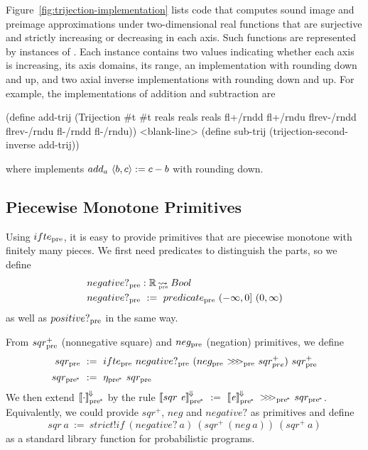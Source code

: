 Figure~\ref{fig:trijection-implementation} lists code that computes sound image and preimage approximations under two-dimensional real functions that are surjective and strictly increasing or decreasing in each axis.
Such functions are represented by instances of .
Each instance contains two  values indicating whether each axis is increasing, its axis domains, its range, an implementation with rounding down and up, and two axial inverse implementations with rounding down and up.
For example, the implementations of addition and subtraction are
\begin{center}\singlespacing
\begin{schemedisplay}
(define add-trij
  (Trijection #t #t reals reals reals
              fl+/rndd fl+/rndu
              flrev-/rndd flrev-/rndu
              fl-/rndd fl-/rndu))
<blank-line>
(define sub-trij
  (trijection-second-inverse add-trij))
\end{schemedisplay}
\end{center}
where  implements $add_a~\langle{b,c}\rangle := c - b$ with rounding down.

\subsection{Piecewise Monotone Primitives}
\label{sec:piecewise-monotone-primitives}

Using $ifte_\mathrm{pre}$, it is easy to provide primitives that are piecewise monotone with finitely many pieces.
We first need predicates to distinguish the parts, so we define
\begin{equation}
\begin{aligned}
	&negative?_\mathrm{pre} : \mathbb{R} \operatorname{\rightsquigarrow_{\mspace{-20mu}_\mathrm{pre}}} Bool \\
	&negative?_\mathrm{pre}\ :=\ predicate_\mathrm{pre}~(-\infty,0]~(0,\infty)
\end{aligned}
\label{eqn:negative-pre}
\end{equation}
as well as $positive?_\mathrm{pre}$ in the same way.

From $sqr^+_\mathrm{pre}$ (nonnegative square) and $neg_\mathrm{pre}$ (negation) primitives, we define
\begin{equation}
\begin{aligned}
	sqr\pre&\ :=\ \ifpre~negative?\pre~(neg\pre~\comppre~sqr^+_{pre})~sqr^+\pre
\\
	sqr\ppre&\ :=\ \eta\ppre~sqr\pre
\end{aligned}
\end{equation}
We then extend $\left\llbracket{\cdot}\right\rrbracket^{\mspace{-2mu}\Downarrow\mspace{-2mu}}_\mathrm{pre^{\mspace{-2mu}*}}$ by the rule $\meaningofconv{sqr~\mathit{e}}\ppre\ :=\ \meaningofconv{\mathit{e}}\ppre~\compppre~sqr\ppre$.
Equivalently, we could provide $sqr^+$, $neg$ and $negative?$ as primitives and define
\begin{equation}
	sqr~a\ :=\ strict!if~(negative?~a)~(sqr^+~(neg~a))~(sqr^+~a)
\end{equation}
as a standard library function for probabilistic programs.

